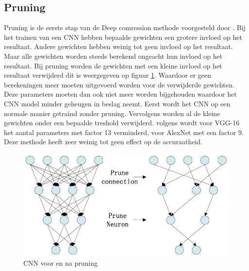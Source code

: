 \subsection{Pruning}
Pruning is de eerste stap van de Deep comression methode voorgesteld door \cite{han_deep_2016}.
Bij het trainen van een CNN hebben bepaalde gewichten een grotere invloed op het resultaat.
Andere gewichten hebben weinig tot geen invloed op het resultaat.
Maar alle gewichten worden steeds berekend ongeacht hun invloed op het resultaat.
Bij pruning worden de gewichten met een kleine invloed op het resultaat verwijderd dit is weergegeven op figuur \ref{fig:pruning}. 
Waardoor er geen berekeningen meer moeten uitgevoerd worden voor de verwijderde gewichten.
Deze parameters moeten dan ook niet meer worden bijgehouden waardoor het CNN model minder geheugen in beslag neemt.
Eerst wordt het CNN op een normale manier getraind zonder pruning.
Vervolgens worden al de kleine gewichten onder een bepaalde treshold verwijderd.
volgens \cite{han_deep_2016} wordt voor VGG-16 het aantal parameters met factor 13 verminderd, voor AlexNet met een factor 9.
Deze methode heeft zeer weinig tot geen effect op de accuraatheid.

\begin{figure}[!ht]
	\centering
	\includegraphics[width=0.65\linewidth]{fig/pruning.jpg}
	\caption{CNN voor en na pruning}
	\label{fig:pruning}
\end{figure}

